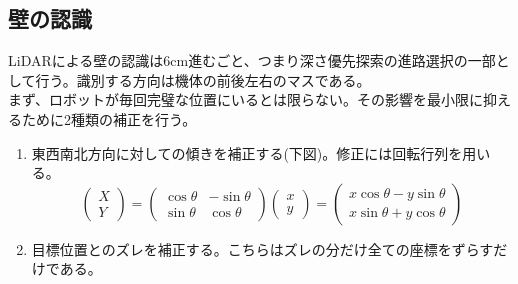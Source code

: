 \documentclass[dvipdfmx,a4paper]{jsarticle}
\begin{document}
    \subsection{壁の認識}
    \noindent
    LiDARによる壁の認識は6cm進むごと、つまり深さ優先探索の進路選択の一部として行う。識別する方向は機体の前後左右のマスである。\\
    \noindent
    まず、ロボットが毎回完璧な位置にいるとは限らない。その影響を最小限に抑えるために2種類の補正を行う。
    \begin{enumerate}
      \item 東西南北方向に対しての傾きを補正する(下図)。修正には回転行列を用いる。\\
      $$
      \begin{pmatrix}
      X\\
      Y
      \end{pmatrix}
      =
      \begin{pmatrix}
      \cos\theta & -\sin\theta \\
      \sin\theta & \cos\theta
      \end{pmatrix}
      \begin{pmatrix}
      x\\
      y
      \end{pmatrix}
      =
      \begin{pmatrix}
      x\cos\theta - y\sin\theta \\
      x\sin\theta + y\cos\theta
      \end{pmatrix}
      $$
      \item 目標位置とのズレを補正する。こちらはズレの分だけ全ての座標をずらすだけである。
    \end{enumerate}
\end{document}
